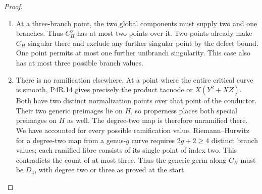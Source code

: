 \begin{proof}
\begin{enumerate}[label={$\langle1\rangle$\arabic*.},leftmargin=*]
\item At a three-branch point, the two global components must
supply two and one branches. Thus $C_H^\nu$ has at most
two points over it. Two points already make $C_H$ singular
there and exclude any further singular point by the defect
bound. One point permits at most one further unibranch
singularity. This case also has at most three possible
branch values.

\item There is no ramification elsewhere. At a point where the
entire critical curve is smooth, P4R.14 gives precisely
the product tacnode or $X(Y^2+XZ)$. Both have two distinct
normalization points over that point of the conductor.
Their two generic preimages lie on $H$, so properness
places both special preimages on $H$ as well. The
degree-two map is therefore unramified there. We have
accounted for every possible ramification value.
Riemann--Hurwitz for a degree-two map from a genus-$g$
curve requires $2g+2\ge4$ distinct branch values; each
ramified fibre consists of its single point of index two.
This contradicts the count of at most three. Thus the
generic germ along $C_H$ must be $D_4$, with degree two
or three as proved at the start.

\end{enumerate}
\end{proof}
